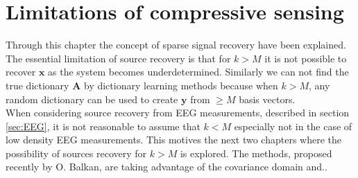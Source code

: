 \section{Limitations of compressive sensing}
Through this chapter the concept of sparse signal recovery have been explained. The essential limitation of source recovery is that for $k>M$ it is not possible to recover $\textbf{x}$ as the system becomes underdetermined. Similarly we can not find the true dictionary $\textbf{A}$ by dictionary learning methods because when $k>M$, any random dictionary can be used to create $\textbf{y}$ from $\geq M$ basis vectors. \\
When considering source recovery from EEG measurements, described in section \ref{sec:EEG}, it is not reasonable to assume that $k<M$ especially not in the case of low density EEG measurements. This motives the next two chapters where the possibility of sources recovery for $k>M$ is explored. The methods, proposed recently by O. Balkan, are taking advantage of the covariance domain and..



